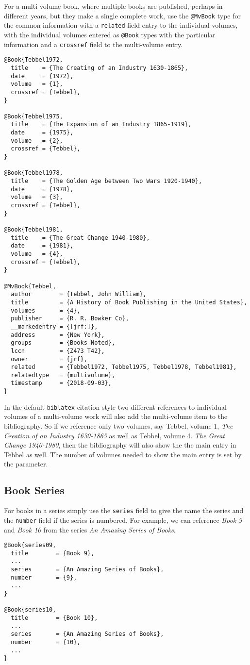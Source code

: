 \documentclass{article}
\begin{document}
For a multi-volume book, where multiple books are published,
perhaps in different years, but they make a single complete work,
use the {\tt @MvBook} type for the common information with a {\tt related}
field entry to the individual volumes, with the individual volumes entered
as {\tt @Book} types with the particular
information and a {\tt crossref} field to the multi-volume entry.

\begin{verbatim}
@Book{Tebbel1972,
  title    = {The Creating of an Industry 1630-1865},
  date     = {1972},
  volume   = {1},
  crossref = {Tebbel},
}

@Book{Tebbel1975,
  title    = {The Expansion of an Industry 1865-1919},
  date     = {1975},
  volume   = {2},
  crossref = {Tebbel},
}

@Book{Tebbel1978,
  title    = {The Golden Age between Two Wars 1920-1940},
  date     = {1978},
  volume   = {3},
  crossref = {Tebbel},
}

@Book{Tebbel1981,
  title    = {The Great Change 1940-1980},
  date     = {1981},
  volume   = {4},
  crossref = {Tebbel},
}

@MvBook{Tebbel,
  author        = {Tebbel, John William},
  title         = {A History of Book Publishing in the United States},
  volumes       = {4},
  publisher     = {R. R. Bowker Co},
  __markedentry = {[jrf:]},
  address       = {New York},
  groups        = {Books Noted},
  lccn          = {Z473 T42},
  owner         = {jrf},
  related       = {Tebbel1972, Tebbel1975, Tebbel1978, Tebbel1981},
  relatedtype   = {multivolume},
  timestamp     = {2018-09-03},
}
\end{verbatim}

In the default {\tt biblatex} citation style two different references
to individual volumes of a multi-volume work will also add the
multi-volume item to the bibliography. So if we reference only two
volumes, say Tebbel, volume 1, {\it The Creation of an Industry
  1630-1865}\cite{Tebbel1972} as well as Tebbel, volume 4. {\it The
  Great Change 1940-1980}\cite{Tebbel1981}, then the bibliography will
also show the the main entry in Tebbel as well. The number of volumes
needed to show the main entry is set by the parameter.

\subsection{Book Series}

For books in a series simply use the {\tt series} field to give the
name the series and the {\tt number} field if the series is
numbered. For example, we can reference {\it Book 9} \cite{book09} and
{\it Book 10} \cite{book10} from the series {\it An Amazing Series of
  Books}.

\begin{verbatim}
@Book{series09,
  title        = {Book 9},
  ...
  series       = {An Amazing Series of Books},
  number       = {9},
  ...
}

@Book{series10,
  title        = {Book 10},
  ...
  series       = {An Amazing Series of Books},
  number       = {10},
  ...
}
\end{verbatim}

\vfil\eject

\printbibliography
\end{document}
